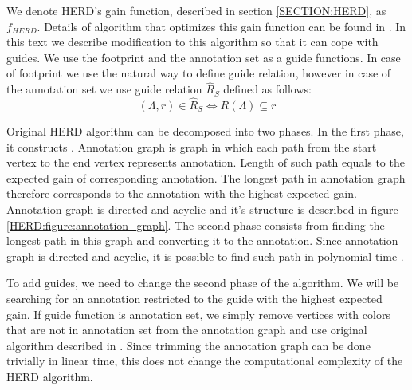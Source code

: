 We denote HERD's gain function, described in section \ref{SECTION:HERD}, as
$f_{HERD}$.  Details of algorithm that optimizes this gain function can be found
in \cite{Nanasi2010, Nanasi2010mgr}. In this text we describe modification to
this algorithm so that it can cope with guides. We use the footprint and the
annotation set as a guide functions. In case of footprint we use the natural way
to define guide relation, however in case of the annotation set we use guide
relation $\hat{R}_S$ defined as follows: \[(\Lambda, r)\in
\hat{R}_S\Leftrightarrow R(\Lambda)\subseteq r\]

Original HERD algorithm can be decomposed into two
phases. In the first phase, it constructs .
Annotation graph is graph in which each path from the start vertex to the end
vertex represents annotation. Length of such path equals to the expected gain of
corresponding annotation. The longest path in annotation graph therefore
corresponds to the annotation with the highest expected gain. Annotation graph
is directed and acyclic and it's structure is described in figure
\ref{HERD:figure:annotation_graph}.  The second phase consists from finding the
longest path in this graph and converting it to the annotation. Since annotation
graph is directed and acyclic, it is possible to find such path in polynomial
time \cite{Nanasi2010mgr}.

To add guides, we need to change the second phase of the algorithm. We will be
searching for an annotation restricted to the guide with the highest expected
gain. If guide function is annotation set,  we simply remove vertices with
colors that are not in annotation set from the annotation graph and use original
algorithm described in \cite{Nanasi2010mgr}. Since trimming the annotation graph
can be done trivially in linear time, this does not change the computational
complexity of the HERD algorithm.

